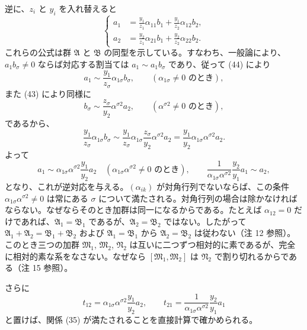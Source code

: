 \documentclass[11pt]{article}
\begin{document}
逆に、$z_i$ と $y_i$ を入れ替えると
\begin{equation}
\left\{
\begin{aligned}
 a_1&=\frac{y_1}{z_1}\alpha_{11}b_1+\frac{y_1}{z_2}\alpha_{12}b_2,\\
 a_2&=\frac{y_2}{z_1}\alpha_{21}b_1+\frac{y_2}{z_2}\alpha_{22}b_2.
\end{aligned}\right.
\tag{44}
\end{equation}
これらの公式は群 $\mathfrak A$ と $\mathfrak B$ の同型を示している。すなわち、一般論により、$a_1b_\sigma\ne0$ ならば対応する割当ては $a_1\sim a_1b_\sigma$ であり、従って (44) により
\[
 a_1\sim\frac{y_1}{z_\sigma}\alpha_{1\sigma}b_\sigma,
 \qquad(\alpha_{1\sigma}\ne0\text{ のとき}),
\]
また (43) により同様に
\[
 b_\sigma\sim\frac{z_\sigma}{y_2}\alpha^{\sigma2}a_2,
 \qquad(\alpha^{\sigma2}\ne0\text{ のとき}),
\]
であるから、
\[
 \frac{y_1}{z_\sigma}\alpha_{1\sigma}b_\sigma
 \sim
 \frac{y_1}{z_\sigma}\alpha_{1\sigma}\frac{z_\sigma}{y_2}\alpha^{\sigma2}a_2
 =\frac{y_1}{y_2}\alpha_{1\sigma}\alpha^{\sigma2}a_2.
\]
よって
\[
 a_1\sim\alpha_{1\sigma}\alpha^{\sigma2}\frac{y_1}{y_2}a_2
 \quad(\alpha_{1\sigma}\alpha^{\sigma2}\ne0\text{ のとき}),
 \qquad
 \frac{1}{\alpha_{1\sigma}\alpha^{\sigma2}}\frac{y_2}{y_1}a_1\sim a_2,
\]
となり、これが逆対応を与える。$(\alpha_{ik})$ が対角行列でないならば、この条件 $\alpha_{1\sigma}\alpha^{\sigma2}\ne0$ は常にある $\sigma$ について満たされる。対角行列の場合は除かなければならない。なぜならそのとき加群は同一になるからである。たとえば $\alpha_{12}=0$ だけであれば、$\mathfrak A_1=\mathfrak B_1$ であるが、$\mathfrak A_2=\mathfrak B_2$ ではない。したがって $\mathfrak A_1+\mathfrak A_2=\mathfrak B_1+\mathfrak B_2$ および $\mathfrak A_1=\mathfrak B_1$ から $\mathfrak A_2=\mathfrak B_2$ は従わない（注 12 参照）。このとき三つの加群 $\mathfrak M_1$, $\mathfrak M_2$, $\mathfrak N_2$ は互いに二つずつ相対的に素であるが、完全に相対的素な系をなさない。なぜなら $[\mathfrak M_1,\mathfrak M_2]$ は $\mathfrak N_2$ で割り切れるからである（注 15 参照）。

さらに
\[
 t_{12}=\alpha_{1\sigma}\alpha^{\sigma2}\frac{y_1}{y_2}a_2,
 \qquad
 t_{21}=\frac{1}{\alpha_{1\sigma}\alpha^{\sigma2}}\frac{y_2}{y_1}a_1
\]
と置けば、関係 (35) が満たされることを直接計算で確かめられる。
\end{document}
